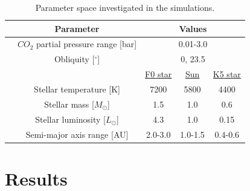 \documentclass[fleqn,usenatbib]{mnras}
\begin{document}

\begin{table}
	\centering
	\caption{Parameter space investigated in the simulations.}
	\label{tab:parameters}
	\begin{tabular}{ccccc}
		\hline
		&\multicolumn{1}{c}{Parameter}&\multicolumn{3}{c}{Values}\\
		\hline
		&\multicolumn{1}{c}{$CO_{\mathrm{2}}$ partial pressure range [bar]}&\multicolumn{3}{c}{0.01-3.0}\\
		&\multicolumn{1}{c}{Obliquity [$^{\circ}$] }&\multicolumn{3}{c}{0, 23.5}\\
		&\multicolumn{1}{c}{}&\multicolumn{1}{c}{\underline{F0 star}}&\multicolumn{1}{c}{\underline{Sun}}&\multicolumn{1}{c}{\underline{K5 star}}\\
		&\multicolumn{1}{c}{Stellar temperature [K]}&\multicolumn{1}{c}{7200}&\multicolumn{1}{c}{5800}&\multicolumn{1}{c}{4400}\\
		&\multicolumn{1}{c}{Stellar mass [$M_{\odot}$]}&\multicolumn{1}{c}{1.5}&\multicolumn{1}{c}{1.0}&\multicolumn{1}{c}{0.6}\\
		&\multicolumn{1}{c}{Stellar luminosity [$L_{\odot}$]}&\multicolumn{1}{c}{4.3}&\multicolumn{1}{c}{1.0}&\multicolumn{1}{c}{0.15}\\
		&\multicolumn{1}{c}{Semi-major axis range [AU]}&\multicolumn{1}{c}{2.0-3.0}&\multicolumn{1}{c}{1.0-1.5}&\multicolumn{1}{c}{0.4-0.6}\\
		\hline
	\end{tabular}
\end{table}

\section{Results}
\end{document}

